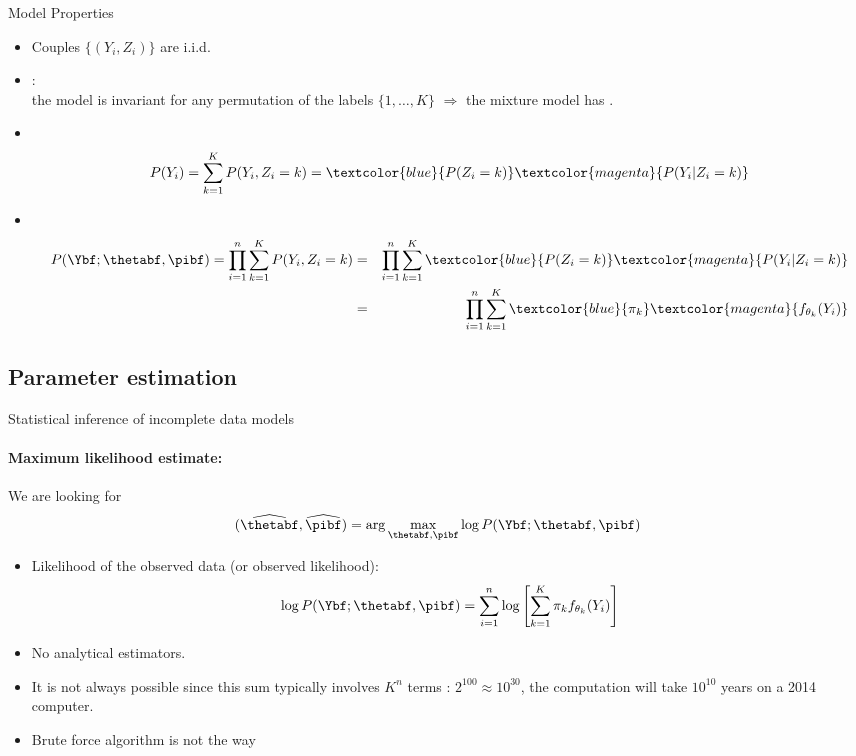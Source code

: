 \begin{frame}[fragile]{Model Properties}
\begin{itemize}
\item Couples $\{(Y_i, Z_i)\}$ are i.i.d.
\item {}:\\ the model is invariant for any permutation of the labels $\{1,
  \dots, K\}$ $\Rightarrow$ the mixture model has .
\item{}\\
$$P(Y_i)=\sum_{k=1}^K P(Y_i, Z_i=k)=\textcolor{blue}{P(Z_i=k)} \textcolor{magenta}{P(Y_i | Z_i=k)} $$
\item{}\\
{\small
\begin{eqnarray*}
P(\Ybf ; \thetabf, \pibf)= \prod_{i=1}^n \sum_{k=1}^K P(Y_i , Z_i=k)  
&=& \prod_{i=1}^n \sum_{k=1}^K \textcolor{blue}{P(Z_i=k)} \textcolor{magenta}{P(Y_i | Z_i=k)} \\ 
&=& \prod_{i=1}^n \sum_{k=1}^K \textcolor{blue}{\pi_k} \textcolor{magenta}{f_{\theta_k}(Y_i)} 
\end{eqnarray*}
}
\end{itemize}
\end{frame}

\subsection{Parameter estimation}


\begin{frame}{Statistical inference of incomplete data models} 
 \paragraph{Maximum likelihood estimate:} We are looking for
  $$
  (\widehat{\thetabf},\widehat{\pibf}) = \arg\max_{\thetabf, \pibf} \log P(\Ybf; \thetabf, \pibf)
  $$
  \begin{itemize}
  \item Likelihood of the observed data (or observed likelihood):
    $$
    \log P(\Ybf; \thetabf, \pibf)=
    \sum_{i=1}^n \log \left[\sum_{k=1}^K \pi_k f_{ \theta_k}(Y_i)\right]
    $$
  \item No analytical estimators. 
  \item  It is not always possible since this sum typically involves $K^n$ terms : $2^{100}\approx10^{30}$, the computation will take $10^{10}$ years on a 2014 computer. 
  \item Brute force algorithm is not the way
  \end{itemize}
\end{frame}


